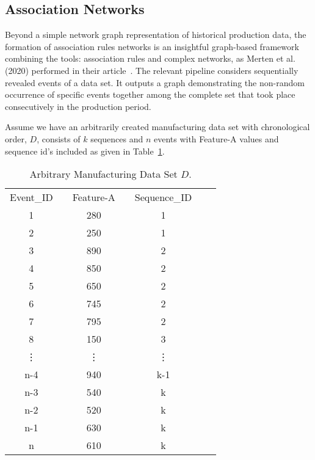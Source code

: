 \subsection*{Association Networks}
%
{\color{red}Beyond a simple network graph representation of historical production data, the formation of association rules networks is an insightful graph-based framework combining the tools: association rules and complex networks, as Merten et al. (2020) performed in their article~\cite{MERTEN2020}. The relevant pipeline considers sequentially revealed events of a data set.} It outputs a graph demonstrating the non-random occurrence of specific events together among the complete set that took place consecutively in the production period.

Assume we have an arbitrarily created manufacturing data set with chronological order, $D$, consists of $k$ sequences and $n$ events with Feature-A values and sequence id's included as given in Table~\ref{Tab:D-dataset}.
\renewcommand{\arraystretch}{1.1}
\begin{table}[ht!]
	\centering
	\begin{tabular}{|cccccc|l}
		\cline{1-6}
		Event\_ID && Feature-A && Sequence\_ID &  \\ \cline{1-6}
		1 	      && 280  	&& 1 		   	&  \\
		2 		  && 250	&& 1 		   	&  \\
		3 	      && 890	&& 2 		    &  \\
		4 		  && 850	&& 2 		    &  \\
		5 	      && 650	&& 2   		    &  \\
		6 	      && 745	&& 2 		    &  \\
		7 		  && 795	&& 2 		    &  \\
		8 		  && 150	&& 3 		    &  \\
		\vdots	  && \vdots && \vdots 	    &  \\
		n-4 	  && 940  	&& k-1	 	    &  \\
		n-3 	  && 540  	&& k			&  \\
		n-2 	  && 520	&& k 		    &  \\
		n-1       && 630	&& k 		    &  \\
		n 		  && 610	&& k 		    &  \\ \cline{1-6}
	\end{tabular}
	\caption{Arbitrary Manufacturing Data Set $D$.}
	\label{Tab:D-dataset}
\end{table}

